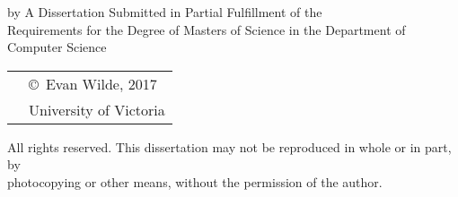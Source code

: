 \pagebreak
{
\centering
\thesistitle
\tpbreak
by
\tpbreak
\nameanddegrees
\tpbreak
A Dissertation Submitted in Partial Fulfillment of the \\
Requirements for the Degree of
\tpbreak
Masters of Science
\tpbreak
in the Department of Computer Science
\vfill
\begin{tabular}{cl}
& \copyright\ Evan Wilde, 2017\\
& \phantom{\copyright} University of Victoria
\end{tabular}
\tpbreak
All rights reserved. This dissertation may not be reproduced in whole or in part, by \\
\hfill photocopying or other means, without the permission of the author.
\hfill
}
\pagebreak
